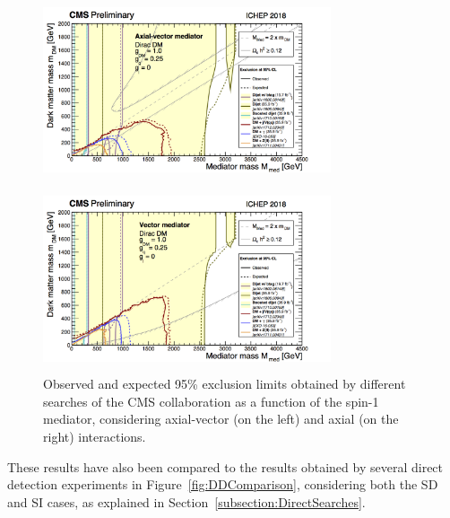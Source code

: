 \documentclass[a4paper, 10pt, openright]{report}
\begin{document}
\begin{figure}[htbp]
\centering
\begin{minipage}[b]{.49\textwidth}
\includegraphics[width=8.5cm, height=5.45cm]{figs/SummaryAxialVector.png}
\end{minipage}\hfill
\begin{minipage}[b]{.49\textwidth}
\includegraphics[width=8.5cm, height=5.45cm]{figs/SummaryVector.png}
\end{minipage} \hfill
\caption{Observed and expected 95\% exclusion limits obtained by different searches of the \ac{CMS} collaboration as a function of the spin-1 mediator, considering axial-vector (on the left) and axial (on the right) interactions.}
\label{fig:SummarySpin1}
\end{figure}

These results have also been compared to the results obtained by several direct detection experiments in Figure~\ref{fig:DDComparison}, considering both the \acf{SD} and \acf{SI} cases, as explained in Section~\ref{subsection:DirectSearches}.
\end{document}
